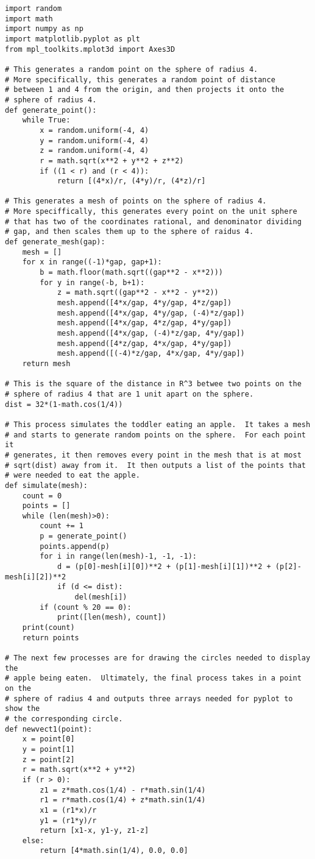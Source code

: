 \documentclass[11pt]{article}
\theoremstyle{definition}
\begin{document}
\begin{verbatim}
import random
import math
import numpy as np
import matplotlib.pyplot as plt
from mpl_toolkits.mplot3d import Axes3D

# This generates a random point on the sphere of radius 4.
# More specifically, this generates a random point of distance
# between 1 and 4 from the origin, and then projects it onto the
# sphere of radius 4.
def generate_point():
    while True:
        x = random.uniform(-4, 4)
        y = random.uniform(-4, 4)
        z = random.uniform(-4, 4)
        r = math.sqrt(x**2 + y**2 + z**2)
        if ((1 < r) and (r < 4)):
            return [(4*x)/r, (4*y)/r, (4*z)/r]

# This generates a mesh of points on the sphere of radius 4.
# More speciffically, this generates every point on the unit sphere
# that has two of the coordinates rational, and denominator dividing
# gap, and then scales them up to the sphere of raidus 4.
def generate_mesh(gap):
    mesh = []
    for x in range((-1)*gap, gap+1):
        b = math.floor(math.sqrt((gap**2 - x**2)))
        for y in range(-b, b+1):
            z = math.sqrt((gap**2 - x**2 - y**2))
            mesh.append([4*x/gap, 4*y/gap, 4*z/gap])
            mesh.append([4*x/gap, 4*y/gap, (-4)*z/gap])
            mesh.append([4*x/gap, 4*z/gap, 4*y/gap])
            mesh.append([4*x/gap, (-4)*z/gap, 4*y/gap])
            mesh.append([4*z/gap, 4*x/gap, 4*y/gap])
            mesh.append([(-4)*z/gap, 4*x/gap, 4*y/gap])
    return mesh

# This is the square of the distance in R^3 betwee two points on the
# sphere of radius 4 that are 1 unit apart on the sphere.
dist = 32*(1-math.cos(1/4))

# This process simulates the toddler eating an apple.  It takes a mesh
# and starts to generate random points on the sphere.  For each point it
# generates, it then removes every point in the mesh that is at most
# sqrt(dist) away from it.  It then outputs a list of the points that
# were needed to eat the apple.
def simulate(mesh):
    count = 0
    points = []
    while (len(mesh)>0):
        count += 1
        p = generate_point()
        points.append(p)
        for i in range(len(mesh)-1, -1, -1):
            d = (p[0]-mesh[i][0])**2 + (p[1]-mesh[i][1])**2 + (p[2]-mesh[i][2])**2
            if (d <= dist):
                del(mesh[i])
        if (count % 20 == 0):
            print([len(mesh), count])
    print(count)
    return points

# The next few processes are for drawing the circles needed to display the
# apple being eaten.  Ultimately, the final process takes in a point on the
# sphere of radius 4 and outputs three arrays needed for pyplot to show the
# the corresponding circle.
def newvect1(point):
    x = point[0]
    y = point[1]
    z = point[2]
    r = math.sqrt(x**2 + y**2)
    if (r > 0):
        z1 = z*math.cos(1/4) - r*math.sin(1/4)
        r1 = r*math.cos(1/4) + z*math.sin(1/4)
        x1 = (r1*x)/r
        y1 = (r1*y)/r
        return [x1-x, y1-y, z1-z]
    else:
        return [4*math.sin(1/4), 0.0, 0.0]


\end{verbatim}
\end{document}
